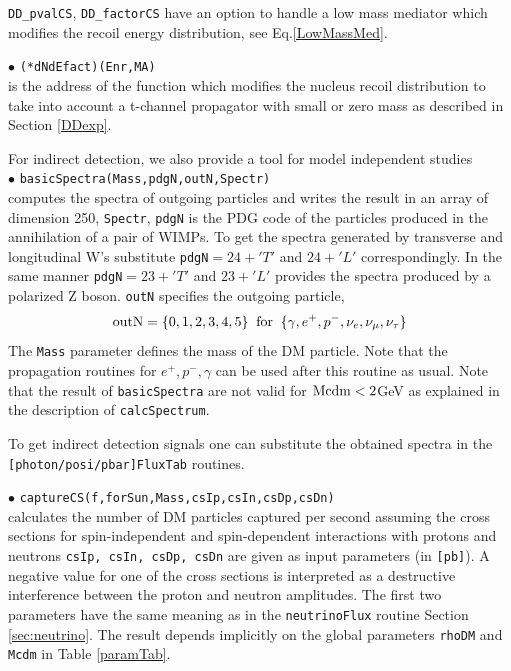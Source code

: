 \documentclass[12pt,a4paper]{article}
\begin{document}
\verb|DD_pvalCS|, \verb|DD_factorCS|   have an option to handle  a low mass mediator which  modifies the recoil energy
distribution, see Eq.\ref{LowMassMed}.



\noindent
$\bullet$ \verb|(*dNdEfact)(Enr,MA)|\\
is the address of the function which modifies the nucleus recoil distribution to take into account a 
t-channel propagator  with  small or zero mass as described in Section \ref{DDexp}.





For indirect detection, we also provide a tool for model independent studies\\ 
\noindent
$\bullet$ \verb|basicSpectra(Mass,pdgN,outN,Spectr)|\\
computes the spectra of outgoing particles and writes the result in an array of dimension 250, \verb|Spectr|,
\verb|pdgN| is the PDG code of the particles produced in the annihilation of a pair of 
WIMPs. To get the spectra generated by transverse and longitudinal W's substitute 
\verb|pdgN|$=24+'T'$ and $24+'L'$ correspondingly. In the same manner \verb|pdgN|$=23+'T'$ and
$23+'L'$  provides the spectra produced by a polarized Z boson.
 \verb|outN|  specifies the outgoing particle,
$$ {\rm outN} = \{0,1,2,3,4,5\} \;\; {\rm for}\;\; \{\gamma,   e^+,  p^-, \nu_e,
\nu_{\mu},\nu_{\tau}\} $$
The {\tt Mass} parameter defines the mass of the DM particle.
Note that the  propagation routines for $e^+,p^-,\gamma$ can be used after 
this routine as usual. Note that the result of {\tt basicSpectra}
are not valid for ${\rm Mcdm} < 2$GeV as explained in the description of {\tt calcSpectrum}.  

To get indirect detection signals one can substitute the obtained spectra in the\\ 
{\tt [photon/posi/pbar]FluxTab} routines.
  

\noindent $\bullet$ \verb|captureCS(f,forSun,Mass,csIp,csIn,csDp,csDn)|\\
calculates the number of DM particles captured per second assuming the cross sections
for  spin-independent and spin-dependent 
interactions with protons and neutrons   {\tt csIp, csIn, csDp, csDn} are
given as input parameters (in {\tt [pb]}). 
A negative value for one of the cross sections  is interpreted as a destructive
interference between the  proton and neutron amplitudes. The first two
parameters have the same meaning as in the {\tt neutrinoFlux} routine Section \ref{sec:neutrino}. The
result  depends implicitly on the global parameters {\tt rhoDM} and {\tt
Mcdm} in Table \ref{paramTab}. 
\end{document}

